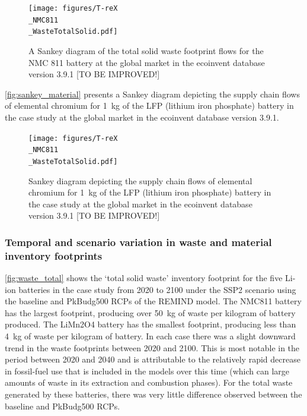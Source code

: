\begin{figure}[H]
    \centering
    \texttt{[image: figures/T-reX\\\_NMC811\\\_WasteTotalSolid.pdf]}
    \caption{A Sankey diagram of the total solid waste footprint flows for the NMC 811 battery at the global market in the ecoinvent database version 3.9.1 [TO BE IMPROVED!]}\label{fig:sankey_waste}
\end{figure}

\autoref{fig:sankey_material} presents a Sankey diagram depicting the supply chain flows of elemental chromium for 1~kg of the LFP (lithium iron phosphate) battery in the case study at the global market in the ecoinvent database version 3.9.1. 

\begin{figure}[H]
    \centering
    \texttt{[image: figures/T-reX\\\_NMC811\\\_WasteTotalSolid.pdf]}
    \caption{Sankey diagram depicting the supply chain flows of elemental chromium for 1~kg of the LFP (lithium iron phosphate) battery in the case study at the global market in the ecoinvent database version 3.9.1 [TO BE IMPROVED!]}\label{fig:sankey_material}
\end{figure}


\subsubsection{Temporal and scenario variation in waste and material inventory footprints}\label{sec:results-case_study-total_footprints}

\autoref{fig:waste_total} shows the `total solid waste' inventory footprint for the five Li-ion batteries in the case study from 2020 to 2100 under the SSP2 scenario using the baseline and PkBudg500 RCPs of the REMIND model. The NMC811 battery has the largest footprint, producing over 50~kg of waste per kilogram of battery produced. The LiMn2O4 battery has the smallest footprint, producing less than 4~kg of waste per kilogram of battery. In each case there was a slight downward trend in the waste footprints between 2020 and 2100. This is most notable in the period between 2020 and 2040 and is attributable to the relatively rapid decrease in fossil-fuel use that is included in the models over this time (which can large amounts of waste in its extraction and combustion phases). For the total waste generated by these batteries, there was very little difference observed between the baseline and PkBudg500 RCPs.


